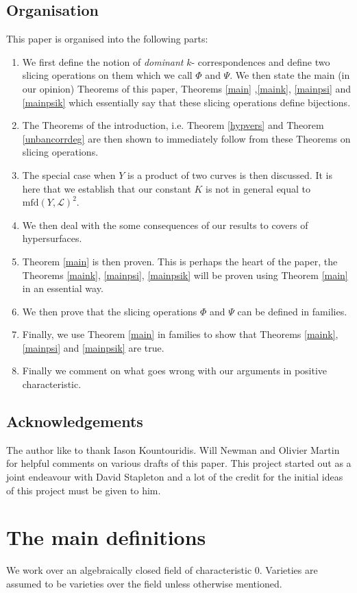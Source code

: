 \documentclass[12pt]{amsart}
\numberwithin{equation}{section}
\numberwithin{theorem}{section}
\theoremstyle{definition}
\theoremstyle{definition}
\def\Lc{{\mathcal{L}}}
\begin{document}
\subsection{Organisation}
This paper is organised into the following parts:
\begin{enumerate}
    \item We first define the notion of \emph{dominant} $k$- correspondences and define two slicing operations on them which we call $\Phi$ and $\Psi$. We then state the main (in our opinion) Theorems of this paper, Theorems \ref{main} ,\ref{maink}, \ref{mainpsi} and \ref{mainpsik} which essentially say that these slicing operations define bijections. 
    \item The Theorems of the introduction, i.e. Theorem \ref{hypvers} and Theorem \ref{unbancorrdeg} are then shown to immediately follow  from these Theorems on slicing operations.
    \item 
    The special case when $Y$ is a product of two curves is then discussed. It is here that we establish that our constant $K$ is not in general equal to $\textrm{mfd}(Y,\Lc)^2$.
    \item We then deal with the some consequences of our results to covers of hypersurfaces.
    \item  Theorem \ref{main} is then proven. This is perhaps the heart of the paper, the Theorems \ref{maink}, \ref{mainpsi}, \ref{mainpsik} will be proven using Theorem \ref{main} in an essential way.
    \item We then prove that the slicing operations $\Phi$ and $\Psi$ can be defined in families.
    \item Finally, we  use Theorem \ref{main} in families to show that Theorems \ref{maink}, \ref{mainpsi} and \ref{mainpsik} are true.
    

    \item Finally we comment on what goes wrong with our arguments in positive characteristic.
\end{enumerate}

\subsection{Acknowledgements}
The author like to thank Iason Kountouridis. Will Newman and Olivier Martin for helpful comments on various drafts of this paper. 
This project started out as a joint endeavour with David Stapleton and a lot of the credit for the initial ideas of this project must be given to him. 
\section{The main definitions}
We work over an algebraically closed field of characteristic $0$. Varieties are assumed to be varieties over the field unless otherwise mentioned.
\end{document}
